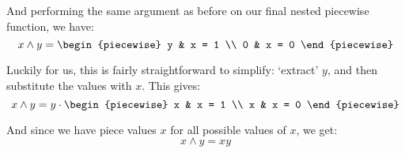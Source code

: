 \begin{example}
    And performing the same argument as before on our final nested piecewise function, we have:
    $$
        x\land y = \begin{piecewise}
            y & x = 1 \\
            0 & x = 0
        \end{piecewise}
    $$

    Luckily for us, this is fairly straightforward to simplify: `extract' $y$, and then substitute the values with $x$. This gives:
    $$
        x\land y = y\cdot\begin{piecewise}
            x & x = 1 \\
            x & x = 0
        \end{piecewise}
    $$

    And since we have piece values $x$ for all possible values of $x$, we get:
    $$
        x\land y = xy
    $$


\end{example}
\newpage